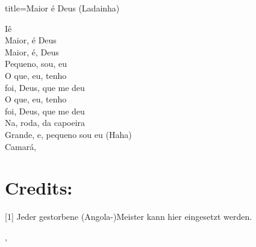 \documentclass[fontsize=14pt, twoside]{scrreprt}
\begin{document}
\begin{multicols*}{2}
\begin{song}{title={Maior é Deus (Ladainha)}}
    \begin{verse*}
Iê\,\\
Maior, é Deus\\
Maior, é, Deus\\
Pequeno, sou, eu\\
O que, eu, tenho\\
foi, Deus, que me deu\\
O que, eu, tenho\\
foi, Deus, que me deu\\
Na, roda, da capoeira\\
Grande, e, pequeno sou eu (Haha)\\
Camará,\\
    \end{verse*}
\end{song}

\chapter*{Credits:}
[1] Jeder  gestorbene (Angola-)Meister kann hier eingesetzt werden.

\end{multicols*},
\end{document}
